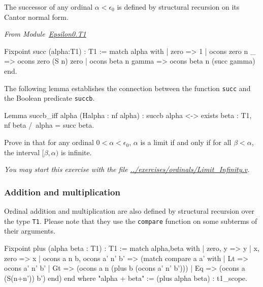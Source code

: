 
The successor of any ordinal $\alpha< \epsilon_0$ is defined by structural 
recursion on its Cantor normal form.

\label{Functions:succ-T1}

\vspace{4pt}
\emph{From Module~\href{../theories/html/hydras.Epsilon0.T1.html\#succ}{Epsilon0.T1}}

\begin{Coqsrc}
Fixpoint succ (alpha:T1) : T1 :=
  match alpha with 
   | zero => 1
   | ocons zero n _ => ocons zero (S n) zero
   | ocons beta n gamma => ocons beta n (succ gamma)
 end.
\end{Coqsrc}


The following lemma establishes the connection between the  function
\texttt{succ} and the Boolean predicate \texttt{succb}.


\begin{Coqsrc}
 Lemma succb_iff alpha (Halpha : nf alpha) :
  succb alpha <-> exists beta : T1, nf beta /\ alpha = succ  beta.
\end{Coqsrc}

 \begin{exercise}
Prove in \coq{} that for any ordinal $0< \alpha<\epsilon_0$, $\alpha$ is a limit if 
and only if for all $\beta<\alpha$, the interval $[\beta,\alpha)$ is
infinite.

\emph{You may start this exercise with the file
\url{../exercises/ordinals/Limit_Infinity.v}.}
 \end{exercise}


\subsubsection{Addition and multiplication}

Ordinal addition and multiplication are also defined by structural recursion over the type \texttt{T1}. Please note that they use the \texttt{compare} function on some subterms of their arguments.

\label{sect:infix-plus-T1}

\begin{Coqsrc}
Fixpoint plus (alpha beta : T1) : T1 :=
  match alpha,beta with
 |  zero, y  => y
 |  x, zero  => x
 |  ocons a n b, ocons a' n' b' =>
    (match compare a a' with
     | Lt => ocons a' n' b'
     | Gt => (ocons a n (plus b (ocons a' n' b')))
     | Eq  => (ocons a (S(n+n')) b')
     end)
  end
where "alpha + beta" := (plus alpha beta) : t1_scope.
\end{Coqsrc}

